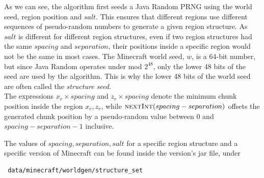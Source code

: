 \documentclass{article}
\begin{document}
As we can see, the algorithm first seeds a Java Random PRNG using the world seed, region position and $salt$. This ensures that different regions use different sequences of pseudo-random numbers to generate a given region structure. As $salt$ is different for different region structures, even if two region structures had the same $spacing$ and $separation$, their positions inside a specific region would not be the same in most cases. The Minecraft world seed, $w$, is a 64-bit number, but since Java Random operates under mod $2^{48}$, only the lower 48 bits of the seed are used by the algorithm. This is why the lower 48 bits of the world seed are often called the \emph{structure seed}. \\
The expressions $x_r \times spacing$ and $z_r \times spacing$ denote the minimum chunk position inside the region $x_r, z_r$, while $\Call{nextInt}{spacing - separation}$ offsets the generated chunk position by a pseudo-random value between 0 and $spacing - separation - 1$ inclusive.

The values of $spacing, separation, salt$ for a specific region structure and a specific version of Minecraft can be found inside the version's jar file, under 
\begin{verbatim} data/minecraft/worldgen/structure_set \end{verbatim}
\end{document}
